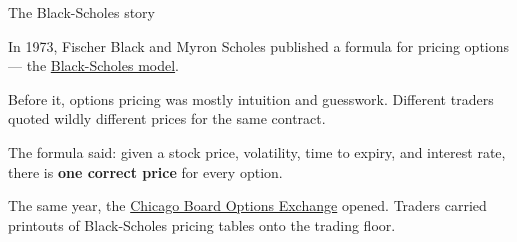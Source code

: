 \documentclass[aspectratio=169,11pt]{beamer}
\begin{document}

\begin{frame}[plain,label=part1]
\vfill
\begin{center}
  \setlength{\fboxrule}{2.5pt}%
\end{center}
\vfill
\end{frame}

\begin{frame}[label=blackscholes]{The Black-Scholes story}

In 1973, Fischer Black and Myron Scholes published a formula for pricing options --- the \href{https://en.wikipedia.org/wiki/Black\%E2\%80\%93Scholes_model}{Black-Scholes model}.

\vspace{0.5em}

Before it, options pricing was mostly intuition and guesswork. Different traders quoted wildly different prices for the same contract.

\vspace{0.5em}

The formula said: given a stock price, volatility, time to expiry, and interest rate, there is \textbf{one correct price} for every option.

\vspace{0.8em}

\begin{center}
\end{center}

\vspace{0.3em}
{\small The same year, the \href{https://en.wikipedia.org/wiki/Chicago_Board_Options_Exchange}{Chicago Board Options Exchange} opened. Traders carried printouts of Black-Scholes pricing tables onto the trading floor.}
\end{frame}
\end{document}
